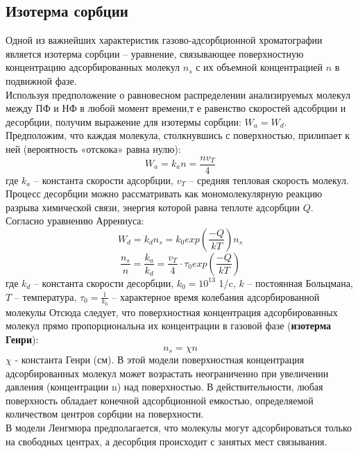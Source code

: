 \documentclass[12pt]{article}
\begin{document}
\begin{flushleft}
\subsection{Изотерма сорбции}
Одной из важнейших характеристик газово-адсорбционной хроматографии является изотерма сорбции – уравнение, связывающее поверхностную концентрацию адсорбированных молекул $n_s$ с их объемной концентрацией $n$ в подвижной фазе.\\
Используя предположение о равновесном
распределении анализируемых молекул между ПФ и НФ в любой момент времени,т е равенство скоростей адсобрции и десорбции,  получим выражение для изотермы сорбции: $W_a = W_d$.\\
Предположим, что каждая молекула,
столкнувшись с поверхностью, прилипает к ней (вероятность «отскока» равна
нулю):
\begin{equation}
W_a = k_an=\frac{nv_T}{4}
\end{equation}
где $k_a$ – константа скорости адсорбции, $v_T$ – средняя тепловая скорость молекул.\\
Процесс
десорбции можно рассматривать как мономолекулярную реакцию разрыва химической
связи, энергия которой равна теплоте адсорбции $Q$.\\
Согласно уравнению Аррениуса:
\begin{equation}
W_d = k_dn_s=k_0exp(\frac{-Q}{kT})n_s
\end{equation} 
\begin{equation}
\frac{n_s}{n}=\frac{k_a}{k_d}=\frac{v_T}{4}\cdot\tau_0 exp(\frac{-Q}{kT})
\end{equation}
где $k_d$ – константа скорости десорбции, $k_0 = 10^{13}$ 1/c, $k$ – постоянная Больцмана, $T$ –
температура, $\tau_0 = \frac{1}{k_0}$ – характерное время колебания адсорбированной молекулы
Отсюда
следует, что поверхностная концентрация адсорбированных молекул прямо
пропорциональна их концентрации в газовой фазе (\textbf{изотерма Генри}):
\begin{equation}
n_s=\chi n
\end{equation}
$\chi$ - константа Генри (см).
В этой модели поверхностная
концентрация адсорбированных молекул может возрастать неограниченно при
увеличении давления (концентрации n) над поверхностью. В действительности, любая
поверхность обладает конечной адсорбционной емкостью, определяемой количеством
центров сорбции на поверхности.\\
В модели Ленгмюра предполагается, что молекулы могут адсорбироваться только на
свободных центрах, а десорбция происходит с занятых мест связывания.

\end{flushleft}
\end{document}
